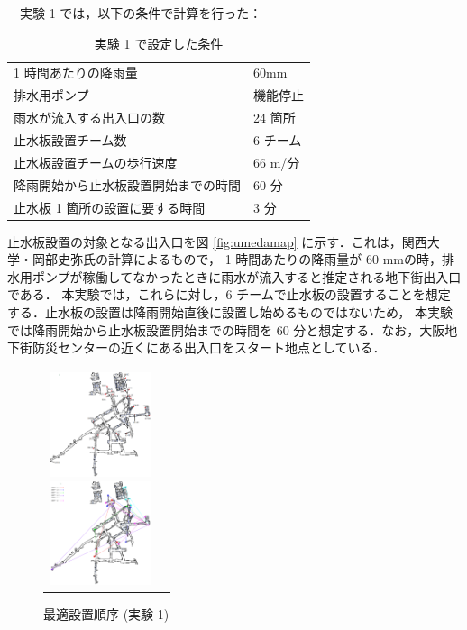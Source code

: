 \documentclass[a4paper,10pt]{jarticle}
\begin{document}
　実験 1 では，以下の条件で計算を行った：
\vspace{-3mm}
\begin{table}[H]
 \begin{center}
   \caption{実験 1 で設定した条件}
  \begin{tabular}{ll}
   \hline
   1 時間あたりの降雨量 & 60mm \\
   排水用ポンプ & 機能停止 \\
   雨水が流入する出入口の数 & 24 箇所 \\
   止水板設置チーム数 & 6 チーム \\
   止水板設置チームの歩行速度 & 66 m/分  \\
   降雨開始から止水板設置開始までの時間 & 60 分 \\
   止水板 1 箇所の設置に要する時間 & 3 分 \\
   \hline
  \end{tabular}
  \label{tb:ex1}
 \end{center}
\end{table}
\vspace{-6mm}
止水板設置の対象となる出入口を図 \ref{fig:umedamap} に示す．これは，関西大学・岡部史弥氏の計算によるもので，
1 時間あたりの降雨量が 60 mmの時，排水用ポンプが稼働してなかったときに雨水が流入すると推定される地下街出入口である．
本実験では，これらに対し，6 チームで止水板の設置することを想定する．止水板の設置は降雨開始直後に設置し始めるものではないため，
本実験では降雨開始から止水板設置開始までの時間を 60 分と想定する．なお，大阪地下街防災センターの近くにある出入口をスタート地点としている．
\begin{figure}[H]
  \begin{tabular}{cc}
  \begin{minipage}{0.5\hsize}
  \begin{center}
    \includegraphics[width=30mm]{umedamap.png}
  \end{center}
  \vspace{-5.2mm}
\caption{出入口流入箇所}
\label{fig:zikken2_4team_gurahu}
\end{minipage}
\begin{minipage}{0.5\hsize}
\begin{center}
\includegraphics[width=30mm]{zikken1_settizyunzyo_map.pdf}
\end{center}
\vspace{-5.2mm}
\caption{最適設置順序 (実験 1)}
\label{fig:zikken2_5team_gurahu}
\end{minipage}
\end{tabular}
\end{figure}
\end{document}
